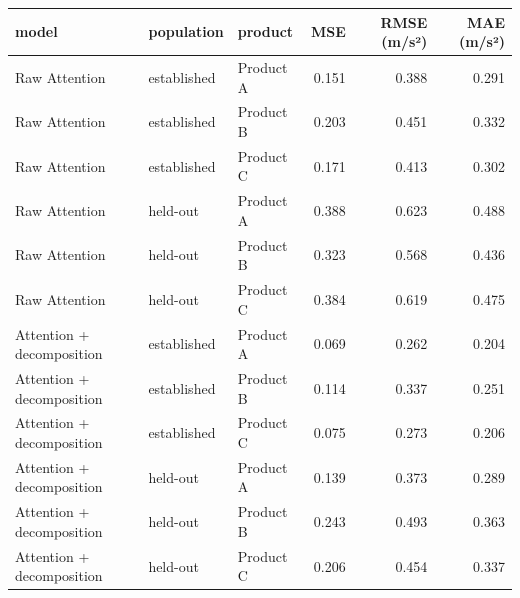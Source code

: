 \begin{tabular}{lllrrr}
\toprule
model & population & product & MSE & RMSE (m/s²) & MAE (m/s²) \\
\midrule
Raw Attention & established & Product A & 0.151 & 0.388 & 0.291 \\
Raw Attention & established & Product B & 0.203 & 0.451 & 0.332 \\
Raw Attention & established & Product C & 0.171 & 0.413 & 0.302 \\
Raw Attention & held-out & Product A & 0.388 & 0.623 & 0.488 \\
Raw Attention & held-out & Product B & 0.323 & 0.568 & 0.436 \\
Raw Attention & held-out & Product C & 0.384 & 0.619 & 0.475 \\
Attention + decomposition & established & Product A & 0.069 & 0.262 & 0.204 \\
Attention + decomposition & established & Product B & 0.114 & 0.337 & 0.251 \\
Attention + decomposition & established & Product C & 0.075 & 0.273 & 0.206 \\
Attention + decomposition & held-out & Product A & 0.139 & 0.373 & 0.289 \\
Attention + decomposition & held-out & Product B & 0.243 & 0.493 & 0.363 \\
Attention + decomposition & held-out & Product C & 0.206 & 0.454 & 0.337 \\
\bottomrule
\end{tabular}
